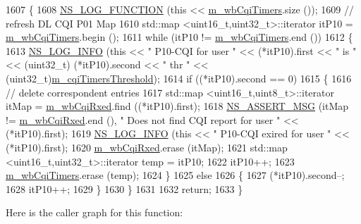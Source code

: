 \begin{DoxyCode}
1607 \{
1608   \hyperlink{log-macros-disabled_8h_a90b90d5bad1f39cb1b64923ea94c0761}{NS\_LOG\_FUNCTION} (\textcolor{keyword}{this} << \hyperlink{classns3_1_1MmWaveFlexTtiMacScheduler_ac223fa16c9b7e57dd628b387833abeed}{m\_wbCqiTimers}.size ());
1609   \textcolor{comment}{// refresh DL CQI P01 Map}
1610   std::map <uint16\_t,uint32\_t>::iterator itP10 = \hyperlink{classns3_1_1MmWaveFlexTtiMacScheduler_ac223fa16c9b7e57dd628b387833abeed}{m\_wbCqiTimers}.begin ();
1611   \textcolor{keywordflow}{while} (itP10 != \hyperlink{classns3_1_1MmWaveFlexTtiMacScheduler_ac223fa16c9b7e57dd628b387833abeed}{m\_wbCqiTimers}.end ())
1612     \{
1613       \hyperlink{group__logging_gafbd73ee2cf9f26b319f49086d8e860fb}{NS\_LOG\_INFO} (\textcolor{keyword}{this} << \textcolor{stringliteral}{" P10-CQI for user "} << (*itP10).first << \textcolor{stringliteral}{" is "} << (uint32\_t)
      (*itP10).second << \textcolor{stringliteral}{" thr "} << (uint32\_t)\hyperlink{classns3_1_1MmWaveFlexTtiMacScheduler_ab79b59a03053301ed05f22fdb701a7ef}{m\_cqiTimersThreshold});
1614       \textcolor{keywordflow}{if} ((*itP10).second == 0)
1615         \{
1616           \textcolor{comment}{// delete correspondent entries}
1617           std::map <uint16\_t,uint8\_t>::iterator itMap = \hyperlink{classns3_1_1MmWaveFlexTtiMacScheduler_ac5f1e12f1e2a6d4e11dbc2baf7c1166a}{m\_wbCqiRxed}.find ((*itP10).first);
1618           \hyperlink{assert_8h_aff5ece9066c74e681e74999856f08539}{NS\_ASSERT\_MSG} (itMap != \hyperlink{classns3_1_1MmWaveFlexTtiMacScheduler_ac5f1e12f1e2a6d4e11dbc2baf7c1166a}{m\_wbCqiRxed}.end (), \textcolor{stringliteral}{" Does not find CQI report
       for user "} << (*itP10).first);
1619           \hyperlink{group__logging_gafbd73ee2cf9f26b319f49086d8e860fb}{NS\_LOG\_INFO} (\textcolor{keyword}{this} << \textcolor{stringliteral}{" P10-CQI exired for user "} << (*itP10).first);
1620           \hyperlink{classns3_1_1MmWaveFlexTtiMacScheduler_ac5f1e12f1e2a6d4e11dbc2baf7c1166a}{m\_wbCqiRxed}.erase (itMap);
1621           std::map <uint16\_t,uint32\_t>::iterator temp = itP10;
1622           itP10++;
1623           \hyperlink{classns3_1_1MmWaveFlexTtiMacScheduler_ac223fa16c9b7e57dd628b387833abeed}{m\_wbCqiTimers}.erase (temp);
1624         \}
1625       \textcolor{keywordflow}{else}
1626         \{
1627           (*itP10).second--;
1628           itP10++;
1629         \}
1630     \}
1631 
1632   \textcolor{keywordflow}{return};
1633 \}
\end{DoxyCode}


Here is the caller graph for this function\+:


